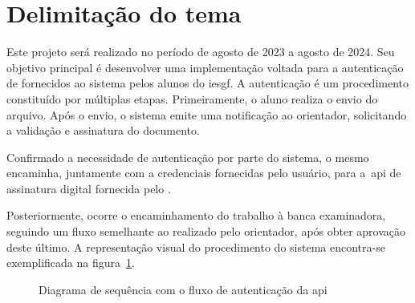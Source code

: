 \section{Delimitação do tema}\label{sec:delimitacao-do-tema}

Este projeto será realizado no período de agosto de 2023 a agosto de 2024.
Seu objetivo principal é desenvolver uma implementação voltada para a
autenticação de  fornecidos ao sistema pelos alunos do
\acrfull{iesgf}.
A autenticação é um procedimento constituído por múltiplas etapas.
Primeiramente, o aluno realiza o envio do arquivo.
Após o envio, o sistema emite uma notificação ao orientador, solicitando a
validação e assinatura do documento.

Confirmado a necessidade de autenticação por parte do sistema, o mesmo encaminha,
juntamente com a credenciais fornecidas pelo usuário, para a~\acrshort{api} de
assinatura digital fornecida pelo \citeauthor*{govbr2020}.

Posteriormente, ocorre o encaminhamento do trabalho à banca examinadora,
seguindo um fluxo semelhante ao realizado pelo orientador, após obter aprovação deste último.
A representação visual do procedimento do sistema encontra-se exemplificada
na figura~\ref{fig:diagrama-sequencia-api}.

\begin{figure}[h!]
    \centering
    \caption[Diagrama de sequência Autenticação \acrshort{api}]{
        Diagrama de sequência com o fluxo de autenticação
        da \acrshort{api}}
    \sourcesearchfootnote
    \label{fig:diagrama-sequencia-api}
\end{figure}
\newpage

